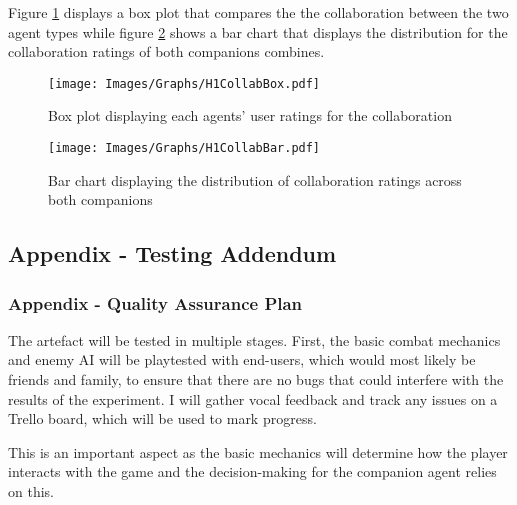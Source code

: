 \documentclass{IEEEtran}
\begin{document}
Figure \ref{fig:AppendixH1CollabBox} displays a box plot that compares the the collaboration between the two agent types while figure \ref{fig:AppendixH1CollabBar} shows a bar chart that displays the distribution for the collaboration ratings of both companions combines.

\begin{figure}[!h]
  \centering
  \texttt{[image: Images/Graphs/H1CollabBox.pdf]}
  
\caption{Box plot displaying each agents' user ratings for the collaboration}
\label{fig:AppendixH1CollabBox}
\end{figure}

\begin{figure}[!h]
  \centering
  \texttt{[image: Images/Graphs/H1CollabBar.pdf]}
  
\caption{Bar chart displaying the distribution of collaboration ratings across both companions}
\label{fig:AppendixH1CollabBar}
\end{figure}

\clearpage

\subsection{Appendix - Testing Addendum}
\label{AppendixTesting}

\subsubsection{Appendix - Quality Assurance Plan}
\label{AppendixQAPlan}


The artefact will be tested in multiple stages. First, the basic combat mechanics and enemy AI will be playtested with end-users, which would most likely be friends and family, to ensure that there are no bugs that could interfere with the results of the experiment. I will gather vocal feedback and track any issues on a Trello board, which will be used to mark progress.

This is an important aspect as the basic mechanics will determine how the player interacts with the game and the decision-making for the companion agent relies on this.
\end{document}
